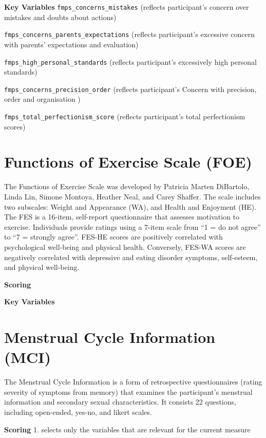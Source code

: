 \documentclass[
]{book}
\begin{document}
\textbf{Key Variables}
\texttt{fmps\_concerns\_mistakes} (reflects participant's concern over mistakes and doubts about actions)

\texttt{fmps\_concerns\_parents\_expectations} (reflects participant's excessive concern with parents' expectations and evaluation)

\texttt{fmps\_high\_personal\_standards} (reflects participant's excessively high personal standards)

\texttt{fmps\_concerns\_precision\_order} (reflects participant's Concern with precision, order and organisation )

\texttt{fmps\_total\_perfectionism\_score} (reflects participant's total perfectionism scores)

\hypertarget{functions-of-exercise-scale-foe}{%
\section{Functions of Exercise Scale (FOE)}\label{functions-of-exercise-scale-foe}}

The Functions of Exercise Scale was developed by Patricia Marten DiBartolo, Linda Lin, Simone Montoya, Heather Neal, and Carey Shaffer. The scale includes two subscales: Weight and Appearance (WA), and Health and Enjoyment (HE). The FES is a 16-item, self-report questionnaire that assesses motivation to exercise. Individuals provide ratings using a 7-item scale from ``1 = do not agree'' to ``7 = strongly agree''. FES-HE scores are positively correlated with psychological well-being and physical health. Conversely, FES-WA scores are negatively correlated with depressive and eating disorder symptoms, self-esteem, and physical well-being.

\textbf{Scoring}

\textbf{Key Variables}

\hypertarget{menstrual-cycle-information-mci}{%
\section{Menstrual Cycle Information (MCI)}\label{menstrual-cycle-information-mci}}

The Menstrual Cycle Information is a form of retrospective questionnaires (rating severity of symptoms from memory) that examines the participant's menstrual information and secondary sexual characteristics. It consists 22 questions, including open-ended, yes-no, and likert scales.

\textbf{Scoring}
1. selects only the variables that are relevant for the current measure
\end{document}
